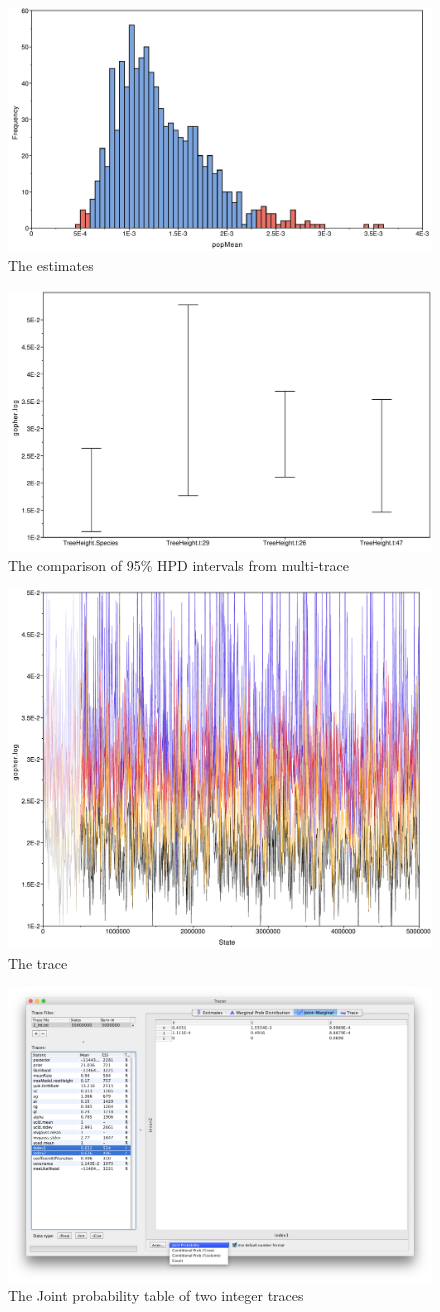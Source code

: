 \documentclass{bioinfo}
\begin{document}



\begin{figure}[H]
\includegraphics[width=.5\textwidth]{./figures/estimates.pdf}  
\caption{The estimates}
\label{fig:estimates}
\end{figure}

\begin{figure}[H]
\includegraphics[width=.5\textwidth]{./figures/comp-95HPD.pdf}  
\caption{The comparison of  95\% HPD intervals from multi-trace}
\label{fig:comp95HPD}
\end{figure}

\begin{figure}[H]
\includegraphics[width=.5\textwidth]{./figures/trace.pdf}  
\caption{The trace}
\label{fig:trace}
\end{figure}


\begin{figure}[H]
\includegraphics[width=.5\textwidth]{./figures/jointPrInt.png}  
\caption{The Joint probability table of two integer traces}
\label{fig:int:jointpr}
\end{figure}
\end{document}

